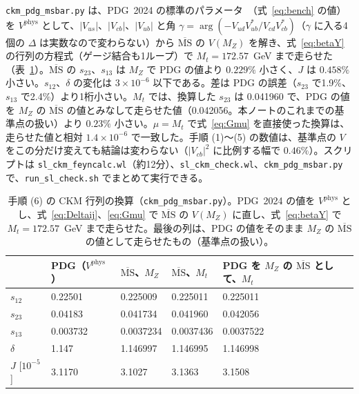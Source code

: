 \documentclass[a4paper,10pt]{ltjsarticle}
\newcommand{\MSbar}{\overline{\mathrm{MS}}}
\begin{document}
\texttt{ckm\_pdg\_msbar.py} は、PDG~2024 の標準のパラメータ~\cite{pdg24}（式~\eqref{eq:bench} の値）を $V^{\mathrm{phys}}$ として、$|V_{us}|$、$|V_{cb}|$、$|V_{ub}|$ と角 $\gamma=\arg(-V_{ud}V_{ub}^*/V_{cd}V_{cb}^*)$（$\gamma$ に入る4個の $\Delta$ は実数なので変わらない）から $\MSbar$ の $V(M_Z)$ を解き、式~\eqref{eq:betaY} の行列の方程式（ゲージ結合も1ループ）で $M_t=172.57$~GeV まで走らせた（表~\ref{tab:pdgms}）。$\MSbar$ の $s_{23}$、$s_{13}$ は $M_Z$ で PDG の値より $0.229\%$ 小さく、$J$ は $0.458\%$ 小さい。$s_{12}$、$\delta$ の変化は $3\times10^{-6}$ 以下である。差は PDG の誤差（$s_{23}$ で1.9\%、$s_{13}$ で2.4\%）より1桁小さい。$M_t$ では、換算した $s_{23}$ は 0.041960 で、PDG の値を $M_Z$ の $\MSbar$ の値とみなして走らせた値（0.042056。本ノートのこれまでの基準点の扱い）より $0.23\%$ 小さい。$\mu=M_t$ で式~\eqref{eq:Gmu} を直接使った換算は、走らせた値と相対 $1.4\times10^{-6}$ で一致した。手順 (1)〜(5) の数値は、基準点の $V$ をこの分だけ変えても結論は変わらない（$|V_{cb}|^2$ に比例する幅で $0.46\%$）。スクリプトは \texttt{sl\_ckm\_feyncalc.wl}（約12分）、\texttt{sl\_ckm\_check.wl}、\texttt{ckm\_pdg\_msbar.py} で、\texttt{run\_sl\_check.sh} でまとめて実行できる。

\begin{table}[tbp]
\centering\small
\caption{手順 (6) の CKM 行列の換算（\texttt{ckm\_pdg\_msbar.py}）。PDG~2024 の値を $V^{\mathrm{phys}}$ とし、式~\eqref{eq:Deltaij}、\eqref{eq:Gmu} で $\MSbar$ の $V(M_Z)$ に直し、式~\eqref{eq:betaY} で $M_t=172.57$~GeV まで走らせた。最後の列は、PDG の値をそのまま $M_Z$ の $\MSbar$ の値として走らせたもの（基準点の扱い）。}
\label{tab:pdgms}
\begin{tabular}{lllll}
\toprule
 & PDG（$V^{\mathrm{phys}}$） & $\MSbar$、$M_Z$ & $\MSbar$、$M_t$ & PDG を $M_Z$ の $\MSbar$ として、$M_t$ \\
\midrule
$s_{12}$ & 0.22501 & 0.225009 & 0.225011 & 0.225011 \\
$s_{23}$ & 0.04183 & 0.041734 & 0.041960 & 0.042056 \\
$s_{13}$ & 0.003732 & 0.0037234 & 0.0037436 & 0.0037522 \\
$\delta$ & 1.147 & 1.146997 & 1.146995 & 1.146998 \\
$J$ [$10^{-5}$] & 3.1170 & 3.1027 & 3.1363 & 3.1508 \\
\bottomrule
\end{tabular}
\end{table}
\end{document}
